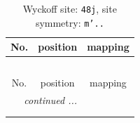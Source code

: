 \documentclass[fleqn,8pt]{jsarticle}
\begin{document}
\renewcommand{\arraystretch}{1.2}
\begin{longtable}{ccc}
\caption{Wyckoff site: {\tt 48j}, site symmetry: {\tt m'..}}
 \\
 \hline \hline
No. & position & mapping \\ \hline \endfirsthead

\multicolumn{2}{l}{\tablename\ \thetable{}} \\
 \hline \hline
No. & position & mapping \\ \hline \endhead

 \hline \hline
\multicolumn{2}{r}{\footnotesize\it continued ...} \\ \endfoot

 \hline \hline
\multicolumn{2}{r}{} \\ \endlastfoot


\end{longtable}
\end{document}
